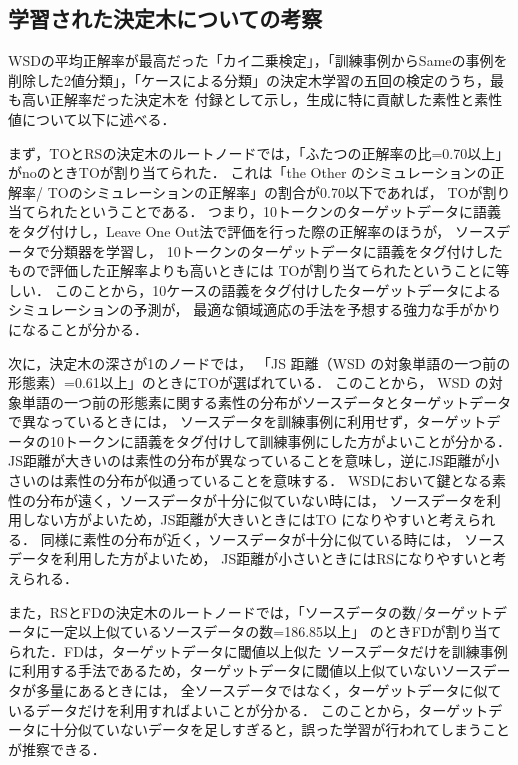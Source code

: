 \documentclass[japanese]{jnlp_1.4}
\begin{document}
\subsection{学習された決定木についての考察}

WSDの平均正解率が最高だった「カイ二乗検定」，「訓練事例からSameの事例を削除した2値分類」，「ケースによる分類」の決定木学習の五回の検定のうち，最も高い正解率だった決定木を
付録として示し，生成に特に貢献した素性と素性値について以下に述べる．

まず，TOとRSの決定木のルートノードでは，「ふたつの正解率の比=0.70以上」がnoのときTOが割り当てられた．
これは「the Other のシミュレーションの正解率/ TOのシミュレーションの正解率」の割合が0.70以下であれば，
TOが割り当てられたということである．
つまり，10トークンのターゲットデータに語義をタグ付けし，Leave One Out法で評価を行った際の正解率のほうが，
ソースデータで分類器を学習し，
10トークンのターゲットデータに語義をタグ付けしたもので評価した正解率よりも高いときには
TOが割り当てられたということに等しい．
このことから，10ケースの語義をタグ付けしたターゲットデータによるシミュレーションの予測が，
最適な領域適応の手法を予想する強力な手がかりになることが分かる．

次に，決定木の深さが1のノードでは，
「JS 距離（WSD の対象単語の一つ前の形態素）=0.61以上」のときにTOが選ばれている．
このことから，
WSD の対象単語の一つ前の形態素に関する素性の分布がソースデータとターゲットデータで異なっているときには，
ソースデータを訓練事例に利用せず，ターゲットデータの10トークンに語義をタグ付けして訓練事例にした方がよいことが分かる．
JS距離が大きいのは素性の分布が異なっていることを意味し，逆にJS距離が小さいのは素性の分布が似通っていることを意味する．
WSDにおいて鍵となる素性の分布が遠く，ソースデータが十分に似ていない時には，
ソースデータを利用しない方がよいため，JS距離が大きいときにはTO になりやすいと考えられる．
同様に素性の分布が近く，ソースデータが十分に似ている時には，
ソースデータを利用した方がよいため，
JS距離が小さいときにはRSになりやすいと考えられる．

また，RSとFDの決定木のルートノードでは，「ソースデータの数/ターゲットデータに一定以上似ているソースデータの数=186.85以上」
のときFDが割り当てられた．FDは，ターゲットデータに閾値以上似た
ソースデータだけを訓練事例に利用する手法であるため，ターゲットデータに閾値以上似ていないソースデータが多量にあるときには，
全ソースデータではなく，ターゲットデータに似ているデータだけを利用すればよいことが分かる．
このことから，ターゲットデータに十分似ていないデータを足しすぎると，誤った学習が行われてしまうことが推察できる．
\end{document}

